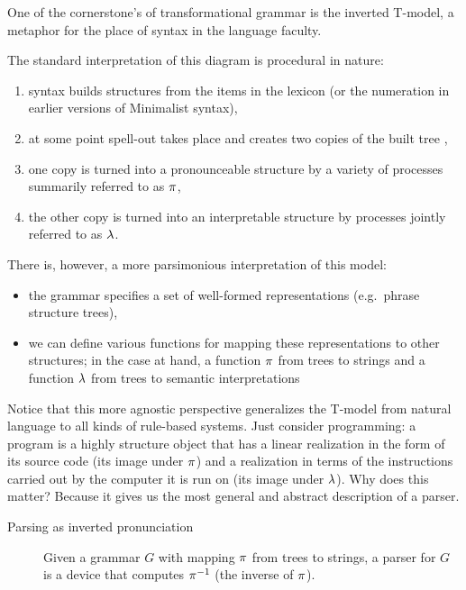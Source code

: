 One of the cornerstone's of transformational grammar is the inverted T-model, a metaphor for the place of syntax in the language faculty.
%
\begin{center}
\end{center}
%
The standard interpretation of this diagram is procedural in nature:
%
\begin{enumerate}
    \item syntax builds structures from the items in the lexicon (or the numeration in earlier versions of Minimalist syntax),
    \item at some point spell-out takes place and creates two copies of the built tree \citep[229]{Chomsky95b},
    \item one copy is turned into a pronounceable structure by a variety of processes summarily referred to as $\pi$,
    \item the other copy is turned into an interpretable structure by processes jointly referred to as $\lambda$.
\end{enumerate}
%
There is, however, a more parsimonious interpretation of this model:
%
\begin{itemize}
    \item the grammar specifies a set of well-formed representations (e.g.\ phrase structure trees),
    \item we can define various functions for mapping these representations to other structures; in the case at hand, a function $\pi$ from trees to strings and a function $\lambda$ from trees to semantic interpretations
\end{itemize}

Notice that this more agnostic perspective generalizes the T-model from natural language to all kinds of rule-based systems.
Just consider programming: a program is a highly structure object that has a linear realization in the form of its source code (its image under $\pi$) and a realization in terms of the instructions carried out by the computer it is run on (its image under $\lambda$).
Why does this matter? Because it gives us the most general and abstract description of a parser.
%
\begin{description}
    \item[Parsing as inverted pronunciation] Given a grammar $G$ with mapping $\pi$ from trees to strings, a parser for $G$ is a device that computes $ \pi^{-1} $ (the inverse of $\pi$).
\end{description}


